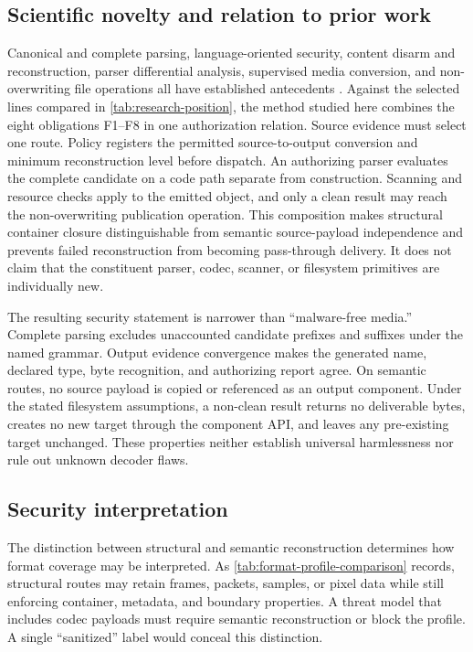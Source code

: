 \subsection{Scientific novelty and relation to prior work}

Canonical and complete parsing, language-oriented security, content disarm and
reconstruction, parser differential analysis, supervised media conversion, and
non-overwriting file operations all have established antecedents
\cite{samuel2012,jana2012,nail2014,everparse2019,darpaSafeDocs,belkind2023,
dubin2023,dubin2024ole,koch2025}. Against the selected lines compared in
\cref{tab:research-position}, the method studied here combines the eight
obligations F1--F8 in one authorization relation. Source evidence must select
one route. Policy registers the permitted source-to-output conversion and
minimum reconstruction level before dispatch. An authorizing parser evaluates
the complete candidate on a code path separate from construction. Scanning and
resource checks apply to the emitted object, and only a clean result may reach
the non-overwriting publication operation. This composition makes structural
container closure distinguishable from semantic source-payload independence and
prevents failed reconstruction from becoming pass-through delivery. It does not
claim that the constituent parser, codec, scanner, or filesystem primitives are
individually new.

The resulting security statement is narrower than ``malware-free media.''
Complete parsing excludes unaccounted candidate prefixes and suffixes under the
named grammar. Output evidence convergence makes the generated name, declared
type, byte recognition, and authorizing report agree. On semantic routes, no
source payload is copied or referenced as an output component. Under the stated
filesystem assumptions, a non-clean result returns no deliverable bytes, creates
no new target through the component API, and leaves any pre-existing target
unchanged. These properties neither establish universal harmlessness nor rule
out unknown decoder flaws.

\subsection{Security interpretation}

The distinction between structural and semantic reconstruction determines how
format coverage may be interpreted. As
\cref{tab:format-profile-comparison} records, structural routes may retain
frames, packets, samples, or pixel data while still enforcing container,
metadata, and boundary properties. A threat model that includes codec payloads
must require semantic reconstruction or block the profile. A single
``sanitized'' label would conceal this distinction.

